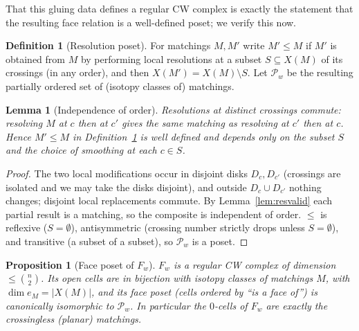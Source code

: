 \documentclass[11pt]{article}
\newtheorem{lemma}{Lemma}
\newtheorem{proposition}{Proposition}
\theoremstyle{definition}
\newtheorem{definition}{Definition}
\theoremstyle{remark}
\begin{document}
That this gluing data defines a regular CW complex is exactly the statement that
the resulting face relation is a well-defined poset; we verify this now.

\begin{definition}[Resolution poset]\label{def:posetdef}
For matchings $M,M'$ write $M'\le M$ if $M'$ is obtained from $M$ by performing
local resolutions at a subset $S\subseteq X(M)$ of its crossings (in any order),
and then $X(M')=X(M)\setminus S$. Let $\mathcal P_w$ be the resulting partially
ordered set of (isotopy classes of) matchings.
\end{definition}

\begin{lemma}[Independence of order]\label{lem:commute}
Resolutions at distinct crossings commute: resolving $M$ at $c$ then at $c'$
gives the same matching as resolving at $c'$ then at $c$. Hence $M'\le M$ in
Definition~\ref{def:posetdef} is well defined and depends only on the subset $S$
and the choice of smoothing at each $c\in S$.
\end{lemma}

\begin{proof}
The two local modifications occur in disjoint disks $D_c,D_{c'}$ (crossings are
isolated and we may take the disks disjoint), and outside $D_c\cup D_{c'}$
nothing changes; disjoint local replacements commute. By
Lemma~\ref{lem:resvalid} each partial result is a matching, so the composite is
independent of order. $\le$ is reflexive ($S=\emptyset$), antisymmetric
(crossing number strictly drops unless $S=\emptyset$), and transitive (a subset
of a subset), so $\mathcal P_w$ is a poset.
\end{proof}

\begin{proposition}[Face poset of $F_w$]\label{prop:poset}
$F_w$ is a regular CW complex of dimension $\le\binom{n}{2}$. Its open cells are
in bijection with isotopy classes of matchings $M$, with $\dim e_M=|X(M)|$, and
its face poset (cells ordered by ``is a face of'') is canonically isomorphic to
$\mathcal P_w$. In particular the $0$-cells of $F_w$ are exactly the
\emph{crossingless} (planar) matchings.
\end{proposition}
\end{document}
